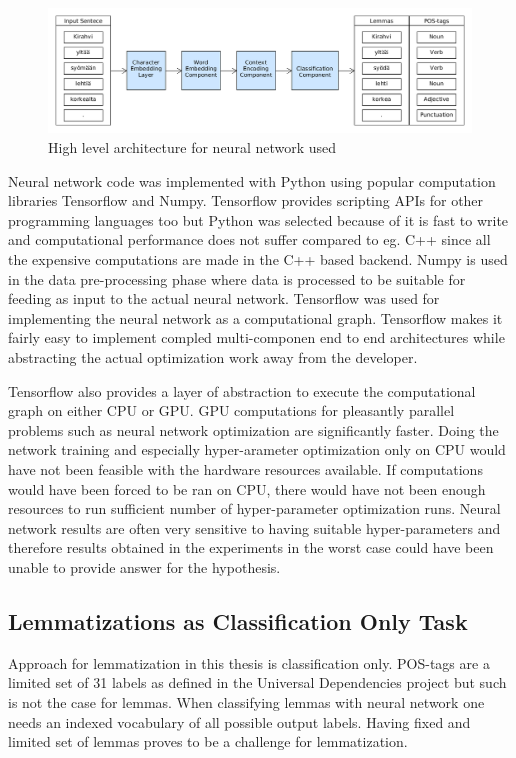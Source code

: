 \documentclass[12pt,a4paper,english
]{tutthesis}
\begin{document}
\begin{figure}[htbp]
\caption{High level architecture for neural network used}
\label{figure:architecture}
\centering
\includegraphics[width=15cm]{architecture.png}
\end{figure}

Neural network code was implemented with Python using popular computation libraries Tensorflow and Numpy. Tensorflow provides scripting APIs for other programming languages too but Python was selected because of it is fast to write and computational performance does not suffer compared to eg. C++ since all the expensive computations are made in the C++ based backend. Numpy is used in the data pre-processing phase where data is processed to be suitable for feeding as input to the actual neural network. Tensorflow was used for implementing the neural network as a computational graph. Tensorflow makes it fairly easy to implement compled multi-componen end to end architectures while abstracting the actual optimization work away from the developer.

Tensorflow also provides a layer of abstraction to execute the computational graph on either CPU or GPU. GPU computations for pleasantly parallel problems such as neural network optimization are significantly faster. Doing the network training and especially hyper-arameter optimization only on CPU would have not been feasible with the hardware resources available. If computations would have been forced to be ran on CPU, there would have not been enough resources to run sufficient number of hyper-parameter optimization runs. Neural network results are often very sensitive to having suitable hyper-parameters and therefore results obtained in the experiments in the worst case could have been unable to provide answer for the hypothesis.

\subsection{Lemmatizations as Classification Only Task}
Approach for lemmatization in this thesis is classification only. POS-tags are a limited set of 31 labels as defined in the Universal Dependencies project but such is not the case for lemmas. When classifying lemmas with neural network one needs an indexed vocabulary of all possible output labels. Having fixed and limited set of lemmas proves to be a challenge for lemmatization.
\end{document}
